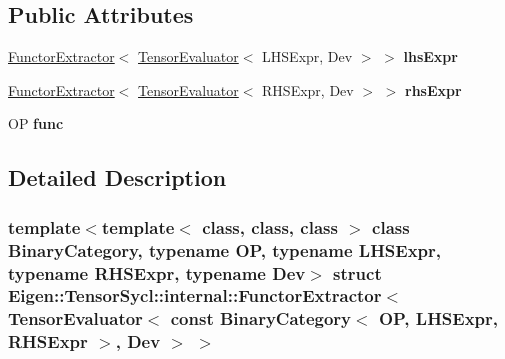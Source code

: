 \subsection*{Public Attributes}
\begin{DoxyCompactItemize}
\item 
\mbox{\label{struct_eigen_1_1_tensor_sycl_1_1internal_1_1_functor_extractor_3_01_tensor_evaluator_3_01const_08f8f7dde0ee1dac917205b74fcd4dba8_ae8e1c081e6b4dcc5dc0d50c3c9e2a724}} 
\hyperlink{struct_eigen_1_1_tensor_sycl_1_1internal_1_1_functor_extractor}{Functor\+Extractor}$<$ \hyperlink{struct_eigen_1_1_tensor_evaluator}{Tensor\+Evaluator}$<$ L\+H\+S\+Expr, Dev $>$ $>$ {\bfseries lhs\+Expr}
\item 
\mbox{\label{struct_eigen_1_1_tensor_sycl_1_1internal_1_1_functor_extractor_3_01_tensor_evaluator_3_01const_08f8f7dde0ee1dac917205b74fcd4dba8_aaef0e2339b6ab48512465f7f15ae8639}} 
\hyperlink{struct_eigen_1_1_tensor_sycl_1_1internal_1_1_functor_extractor}{Functor\+Extractor}$<$ \hyperlink{struct_eigen_1_1_tensor_evaluator}{Tensor\+Evaluator}$<$ R\+H\+S\+Expr, Dev $>$ $>$ {\bfseries rhs\+Expr}
\item 
\mbox{\label{struct_eigen_1_1_tensor_sycl_1_1internal_1_1_functor_extractor_3_01_tensor_evaluator_3_01const_08f8f7dde0ee1dac917205b74fcd4dba8_ad3b98dca91b1ea38660e77e553073fab}} 
OP {\bfseries func}
\end{DoxyCompactItemize}


\subsection{Detailed Description}
\subsubsection*{template$<$template$<$ class, class, class $>$ class Binary\+Category, typename OP, typename L\+H\+S\+Expr, typename R\+H\+S\+Expr, typename Dev$>$\newline
struct Eigen\+::\+Tensor\+Sycl\+::internal\+::\+Functor\+Extractor$<$ Tensor\+Evaluator$<$ const Binary\+Category$<$ O\+P, L\+H\+S\+Expr, R\+H\+S\+Expr $>$, Dev $>$ $>$}

